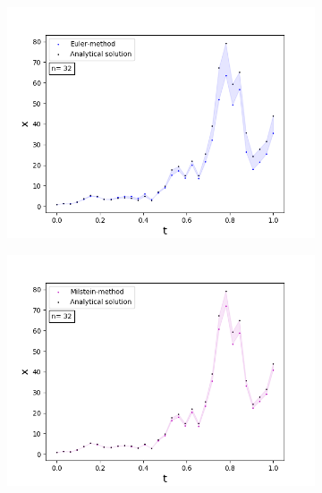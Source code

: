 \begin{figure}[!h]
\centering
   \begin{subfigure}{0.49\linewidth} \centering
     \includegraphics[scale=0.4]{Content/Graphics/Appendix/1gbm}
   \end{subfigure}
   \begin{subfigure}{0.49\linewidth} \centering
     \includegraphics[scale=0.4]{Content/Graphics/Appendix/2gbm}
   \end{subfigure}
   \begin{subfigure}{0.49\linewidth} \centering

\end{subfigure}
\end{figure}
